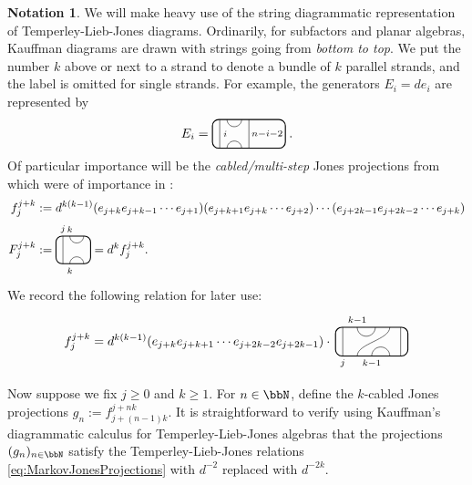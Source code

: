 \documentclass[11pt]{article}
\theoremstyle{plain}
\theoremstyle{definition}
\newtheorem{nota}[thm]{Notation}
\begin{document}
\begin{nota}
\label{nota:TLJK Diagrams}
We will make heavy use of the string diagrammatic representation of Temperley-Lieb-Jones diagrams.
Ordinarily, for subfactors and planar algebras, Kauffman diagrams \cite{MR899057} are drawn with strings going from \emph{bottom to top}. 
We put the number $k$ above or next to a strand to denote a bundle of $k$ parallel strands, and the label is omitted for single strands.
For example, the generators $E_i = de_i$ are represented by
$$
E_i
=
\begin{tikzpicture}[baseline = .3cm]
	\draw[thick, rounded corners = 5pt] (0,0) rectangle (2,.8);
	\draw (.2,0) -- (.2,.8);
	\draw (1,0) -- (1,.8);
	\draw (.4,.8) arc (-180:0:.2cm);
	\draw (.4,0) arc (180:0:.2cm);
	\node at (.35,.4) {\scriptsize{$i$}};
	\node at (1.5,.4) {\scriptsize{$n{-}i{-}2$}};
\end{tikzpicture}\,.
$$
Of particular importance will be the \emph{cabled/multi-step} Jones projections from \cite{MR965748} which were of importance in \cite{MR1424954,MR2812459}:
\begin{align*}
f^{j+k}_j
&:=
d^{k(k-1)}(e_{j+k}e_{j+k-1}\cdots e_{j+1})(e_{j+k+1}e_{j+k}\cdots e_{j+2})\cdots(e_{j+2k-1}e_{j+2k-2}\cdots e_{j+k})
\\
F^{j+k}_j
&:=
\begin{tikzpicture}[baseline = .3cm]
	\draw[thick, rounded corners = 5pt] (0,0) rectangle (1,.8);
	\draw (.2,0) -- (.2,.8);
	\draw (.4,.8) arc (-180:0:.2cm);
	\draw (.4,0) arc (180:0:.2cm);
	\node at (.4,1) {\scriptsize{$k$}};
	\node at (.4,-.2) {\scriptsize{$k$}};
	\node at (.2,1) {\scriptsize{$j$}};
\end{tikzpicture}
=
d^k f^{j+k}_j.
\end{align*}
We record the following relation for later use:
\begin{equation}
\label{eq:MultistepRelation}
f^{j+k}_j
=
d^{k(k-1)}(e_{j+k}e_{j+k+1}\cdots e_{j+2k-2}e_{j+2k-1})
\cdot\,
\begin{tikzpicture}[baseline = .3cm]
	\draw[thick, rounded corners = 5pt] (0,0) rectangle (2,.8);
	\draw (.2,0) -- (.2,.8);
	\draw (1.8,0) -- (1.8,.8);
	\draw (.6,.8) arc (-180:0:.25cm);
	\draw (.6,0)  .. controls ++(90:.35cm) and ++(270:.35cm) .. (1.5,.8);
	\draw (1,0) arc (180:0:.25cm);
	\node at (.6,1) {\scriptsize{$k{-}1$}};
	\node at (1,-.2) {\scriptsize{$k{-}1$}};
	\node at (.2,-.2) {\scriptsize{$j$}};
\end{tikzpicture}
\end{equation}

Now suppose we fix $j\geq 0$ and $k\geq 1$.
For $n\in \bbN$, define the $k$-cabled Jones projections
$
g_n := f^{j+nk}_{j+(n-1)k}
$.
It is straightforward to verify using Kauffman's diagrammatic calculus for Temperley-Lieb-Jones algebras that the projections $(g_n)_{n\in \bbN}$ satisfy the Temperley-Lieb-Jones relations \ref{eq:MarkovJonesProjections} with $d^{-2}$ replaced with $d^{-2k}$.
\end{nota}
\end{document}
